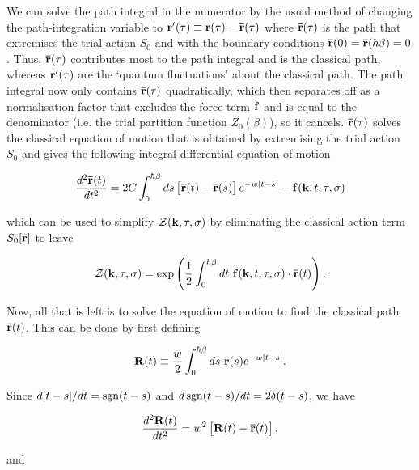 We can solve the path integral in the numerator by the usual method of changing the path-integration variable to $\vb{r'}(\tau) \equiv \vb{r}(\tau) - \vb{\bar{r}}(\tau)$ where $\vb{\bar{r}}(\tau)$ is the path that extremises the trial action $S_0$ and with the boundary conditions $\vb{\bar{r}}(0) = \vb{\bar{r}}(\hbar\beta) = 0$. Thus, $\vb{\bar{r}}(\tau)$ contributes most to the path integral and is the classical path, whereas $\vb{r'}(\tau)$ are the `quantum fluctuations' about the classical path. The path integral now only contains $\vb{\bar{r}}(\tau)$ quadratically, which then separates off as a normalisation factor that excludes the force term $\vb{f}$ and is equal to the denominator (i.e. the trial partition function $Z_0(\beta)$), so it cancels. $\vb{\bar{r}}(\tau)$ solves the classical equation of motion that is obtained by extremising the trial action $S_0$ and gives the following integral-differential equation of motion

\begin{equation}
    \frac{d^2 \vb{\bar{r}}(t)}{dt^2} = 2C \int^{\hbar\beta}_0 ds \left[\vb{\bar{r}}(t) - \vb{\bar{r}}(s)\right] e^{-w\abs{t - s}} - \vb{f}(\vb{k}, t, \tau, \sigma) 
\end{equation}

which can be used to simplify $\mathcal{Z}(\vb{k}, \tau, \sigma)$ by eliminating the classical action term $S_0[\vb{\bar{r}}]$ to leave

\begin{equation}
    \mathcal{Z}(\vb{k}, \tau, \sigma) = \exp\left( \frac{1}{2} \int^{\hbar\beta}_0 dt\ \vb{f}(\vb{k}, t, \tau, \sigma) \cdot \vb{\bar{r}}(t) \right).
\end{equation}

Now, all that is left is to solve the equation of motion to find the classical path $\vb{\bar{r}}(t)$. This can be done by first defining 

\begin{equation}
    \vb{R}(t) \equiv \frac{w}{2} \int^{\hbar\beta}_0 ds\ \vb{\bar{r}}(s) e^{-w\abs{t - s}}.
\end{equation}

Since $d\abs{t-s}/dt = \operatorname{sgn}(t-s)$ and $d\operatorname{sgn}(t-s)/dt = 2\delta(t-s)$, we have

\begin{equation}
    \frac{d^2\vb{R}(t)}{dt^2} = w^2 \left[\vb{R}(t) - \vb{\bar{r}}(t)\right],
\end{equation}

and

